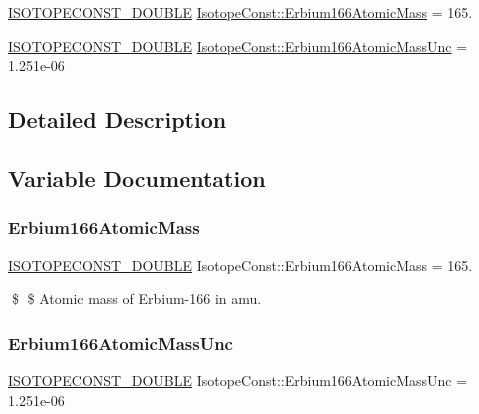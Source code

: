 \begin{DoxyCompactItemize}
\item 
\mbox{\hyperlink{group___isotope_const-_macros_ga8f45a7272ce02c0b4c65c44636ed719a}{I\+S\+O\+T\+O\+P\+E\+C\+O\+N\+S\+T\+\_\+\+D\+O\+U\+B\+LE}} \mbox{\hyperlink{group___isotope_const-_erbium-_er166_ga7828cc4bc92e8c27ec04968660de820b}{Isotope\+Const\+::\+Erbium166\+Atomic\+Mass}} = 165.
\item 
\mbox{\hyperlink{group___isotope_const-_macros_ga8f45a7272ce02c0b4c65c44636ed719a}{I\+S\+O\+T\+O\+P\+E\+C\+O\+N\+S\+T\+\_\+\+D\+O\+U\+B\+LE}} \mbox{\hyperlink{group___isotope_const-_erbium-_er166_gaf9e0120d01e6e52d1049e4c5e6388319}{Isotope\+Const\+::\+Erbium166\+Atomic\+Mass\+Unc}} = 1.\+251e-\/06
\end{DoxyCompactItemize}


\subsection{Detailed Description}


\subsection{Variable Documentation}
\mbox{\label{group___isotope_const-_erbium-_er166_ga7828cc4bc92e8c27ec04968660de820b}} 
\subsubsection{\texorpdfstring{Erbium166\+Atomic\+Mass}{Erbium166AtomicMass}}
{\footnotesize\ttfamily \mbox{\hyperlink{group___isotope_const-_macros_ga8f45a7272ce02c0b4c65c44636ed719a}{I\+S\+O\+T\+O\+P\+E\+C\+O\+N\+S\+T\+\_\+\+D\+O\+U\+B\+LE}} Isotope\+Const\+::\+Erbium166\+Atomic\+Mass = 165.}

\$ \$ Atomic mass of Erbium-\/166 in amu. \mbox{\label{group___isotope_const-_erbium-_er166_gaf9e0120d01e6e52d1049e4c5e6388319}} 
\subsubsection{\texorpdfstring{Erbium166\+Atomic\+Mass\+Unc}{Erbium166AtomicMassUnc}}
{\footnotesize\ttfamily \mbox{\hyperlink{group___isotope_const-_macros_ga8f45a7272ce02c0b4c65c44636ed719a}{I\+S\+O\+T\+O\+P\+E\+C\+O\+N\+S\+T\+\_\+\+D\+O\+U\+B\+LE}} Isotope\+Const\+::\+Erbium166\+Atomic\+Mass\+Unc = 1.\+251e-\/06}

